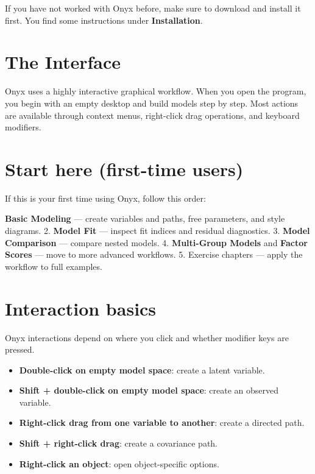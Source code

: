 \documentclass[
  letterpaper,
  DIV=11,
  numbers=noendperiod]{scrreprt}
\providecommand{\tightlist}{%
  \setlength{\itemsep}{0pt}\setlength{\parskip}{0pt}}\usepackage{longtable,booktabs,array}
\begin{document}
If you have not worked with Onyx before, make sure to download and
install it first. You find some instructions under
\textbf{Installation}.

\section{The Interface}\label{the-interface}

Onyx uses a highly interactive graphical workflow. When you open the
program, you begin with an empty desktop and build models step by step.
Most actions are available through context menus, right-click drag
operations, and keyboard modifiers.

\section{Start here (first-time
users)}\label{start-here-first-time-users}

If this is your first time using Onyx, follow this order:

\textbf{Basic Modeling} --- create variables and paths, free parameters,
and style diagrams. 2. \textbf{Model Fit} --- inspect fit indices and
residual diagnostics. 3. \textbf{Model Comparison} --- compare nested
models. 4. \textbf{Multi-Group Models} and \textbf{Factor Scores} ---
move to more advanced workflows. 5. Exercise chapters --- apply the
workflow to full examples.

\section{Interaction basics}\label{interaction-basics}

Onyx interactions depend on where you click and whether modifier keys
are pressed.

\begin{itemize}
\tightlist
\item
  \textbf{Double-click on empty model space}: create a latent variable.
\item
  \textbf{Shift + double-click on empty model space}: create an observed
  variable.
\item
  \textbf{Right-click drag from one variable to another}: create a
  directed path.
\item
  \textbf{Shift + right-click drag}: create a covariance path.
\item
  \textbf{Right-click an object}: open object-specific options.
\end{itemize}
\end{document}
